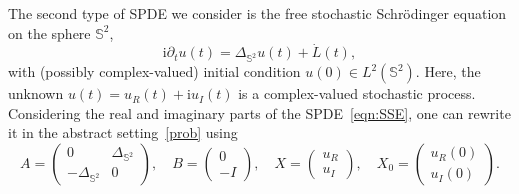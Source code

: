 \documentclass[11pt]{amsart}
\newcommand{\ii}{\ensuremath{\mathrm{i}}}
\newcommand{\IS}{\mathbb{S}}
\newcommand{\Deltalb}{\Delta_{\IS^2}}
\begin{document}
The second type of SPDE we consider is the free stochastic Schr\"odinger equation
on the sphere $\IS^2$,
\begin{equation}\label{eqn:SSE}
\ii\partial_tu(t)=\Deltalb u(t)+\dot L(t),
\end{equation}
with (possibly complex-valued) initial condition $u(0)\in L^2(\IS^2)$.
Here, the unknown $u(t)=u_R(t)+\ii u_I(t)$ is a complex-valued stochastic process.
Considering the real and imaginary parts of the SPDE~\eqref{eqn:SSE}, one can rewrite it in the abstract setting~\eqref{prob}
using
\begin{equation*}
 A=\begin{pmatrix}0 & \Deltalb \\ -\Deltalb & 0 \end{pmatrix},
 \quad B=\begin{pmatrix}0\\-I \end{pmatrix},
 \quad X=\begin{pmatrix} u_R\\u_I\end{pmatrix}, \quad X_0=\begin{pmatrix} u_R(0)\\u_I(0)\end{pmatrix}.
\end{equation*}
\end{document}
